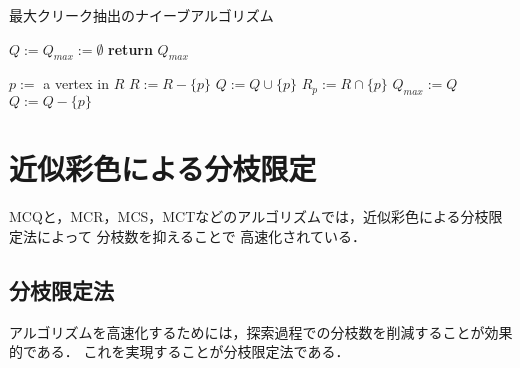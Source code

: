 \begin{algorithm}[p]
  \caption{最大クリーク抽出のナイーブアルゴリズム}
  \label{alg:BasicAlgorithm}
    \begin{algorithmic}[1]
    		\State $Q := Q_{max} := \emptyset $
		\State {}
		\State \textbf{return} 	$Q_{max}$
	\EndProcedure
    \end{algorithmic}
    \begin{algorithmic}[1]
	 
			\State $p :=$ a vertex in $R$
			\State $R := R - \{ p \} $
			\State $Q := Q \cup \{ p \} $
			\State $R_p := R \cap \{ p \} $
				\State {}
				\State $ Q_{max} := Q $
			\EndIf
			\State $Q := Q - \{ p \}$
		\EndWhile
	\EndProcedure
    \end{algorithmic} 
\end{algorithm}

\section{近似彩色による分枝限定}
\label{sec:BB}
MCQ\cite{tomita2003efficient}と，MCR\cite{tomita2007efficient}，MCS，MCT\cite{tomita2016much}などのアルゴリズムでは，近似彩色による分枝限定法によって
分枝数を抑えることで
高速化されている．

\subsection{分枝限定法}
アルゴリズムを高速化するためには，探索過程での分枝数を削減することが効果的である．
これを実現することが分枝限定法である．

